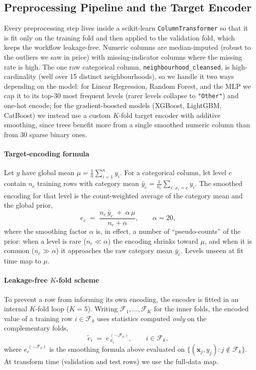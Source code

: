 \documentclass[journal]{IEEEtran}
\begin{document}
\subsection{Preprocessing Pipeline and the Target Encoder}
\label{sec:preproc}
Every preprocessing step lives inside a scikit-learn \texttt{ColumnTransformer}
so that it is fit only on the training fold and then applied to the validation
fold, which keeps the workflow leakage-free. Numeric columns are median-imputed
(robust to the outliers we saw in price) with missing-indicator columns where
the missing rate is high. The one raw categorical column,
\texttt{neighbourhood\_cleansed}, is high-cardinality (well over 15 distinct
neighbourhoods), so we handle it two ways depending on the model: for Linear
Regression, Random Forest, and the MLP we cap it to its top-30 most frequent
levels (rarer levels collapse to \texttt{"Other"}) and one-hot encode; for the
gradient-boosted models (XGBoost, LightGBM, CatBoost) we instead use a custom
$K$-fold target encoder with additive smoothing, since trees benefit more from
a single smoothed numeric column than from 30 sparse binary ones.

\paragraph{Target-encoding formula} Let $y$ have global mean
$\mu=\tfrac{1}{n}\sum_{i=1}^{n}y_i$. For a categorical column, let level $c$
contain $n_c$ training rows with category mean
$\bar y_c=\tfrac{1}{n_c}\sum_{i:\,x_i=c}y_i$. The smoothed encoding for that
level is the count-weighted average of the category mean and the global prior,
\begin{equation}
e_c \;=\; \frac{n_c\,\bar y_c \;+\; \alpha\,\mu}{\,n_c+\alpha\,},
\qquad \alpha = 20,
\label{eq:smooth}
\end{equation}
where the smoothing factor $\alpha$ is, in effect, a number of ``pseudo-counts''
of the prior: when a level is rare ($n_c\!\ll\!\alpha$) the encoding shrinks
toward $\mu$, and when it is common ($n_c\!\gg\!\alpha$) it approaches the raw
category mean $\bar y_c$. Levels unseen at fit time map to $\mu$.

\paragraph{Leakage-free $K$-fold scheme} To prevent a row from informing its own
encoding, the encoder is fitted in an internal $K$-fold loop ($K=5$). Writing
$\mathcal{F}_1,\dots,\mathcal{F}_K$ for the inner folds, the encoded value of a
training row $i\in\mathcal{F}_k$ uses statistics computed \emph{only} on the
complementary folds,
\begin{equation}
\tilde e_i \;=\; e^{\,(-\mathcal{F}_k)}_{\,x_i},
\qquad i\in\mathcal{F}_k,
\label{eq:kfoldte}
\end{equation}
where $e^{\,(-\mathcal{F}_k)}_{c}$ is the smoothing formula above evaluated on
$\{(\mathbf{x}_j,y_j):j\notin\mathcal{F}_k\}$. At transform time (validation and
test rows) we use the full-data map.
\end{document}

